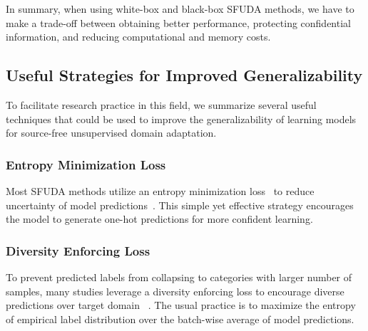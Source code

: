 \documentclass[10pt,journal,compsoc]{IEEEtran}
\begin{document}
In summary, when using white-box and black-box SFUDA methods, we have to make a trade-off between obtaining better performance, protecting confidential information, and reducing computational and memory costs.


\subsection{Useful Strategies for Improved Generalizability}
To facilitate research practice in this field, we summarize several useful techniques that could be used to improve the generalizability of learning models for source-free unsupervised domain adaptation.


\subsubsection{Entropy Minimization Loss}
Most SFUDA methods utilize an entropy minimization loss~\cite{grandvalet2004semi} to reduce uncertainty of model predictions~\cite{liang2020we, bateson2022source, liu2022sourceEM, kothandaraman2021ss, wang2020tent, bateson2020source, liu2022unsupervised2, liu2022unsupervised1, liu2021adapting, fleuret2021uncertainty, hou2020source, xu2022source, kundu2021generalize}.
This simple yet effective strategy encourages the model to generate one-hot predictions for more confident %
learning. 


\subsubsection{Diversity Enforcing Loss}
To prevent predicted labels from collapsing to categories with larger number of samples, many studies leverage a diversity enforcing loss to encourage diverse predictions over target domain~\cite{liang2020we, huang2022relative, wang2021give, roy2022uncertainty, liu2022sourceEM, liang2021umad, dong2021confident, tian2022source} .
The usual practice is to maximize the entropy of empirical label distribution over the batch-wise average of model predictions.
\end{document}
